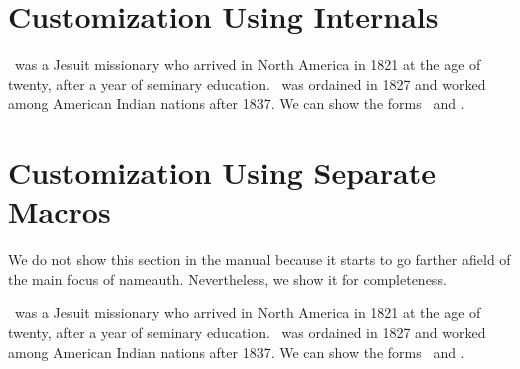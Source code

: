 \documentclass[oneside]{article}
\begin{document}
%
%

\section{Customization Using Internals}

\makeatletter
\newcommand*\Fbox[1]{%
  \if@nameauth@DoAlt\protect\fbox{#1}\else#1\fi
}
\makeatother

\renewcommand*\NamesFormat{}
\renewcommand*\FrontNamesFormat{}
\renewcommand*\MainNameHook{\AltOff}
\renewcommand*\FrontNameHook{\AltOff}

\deSmet\ was a Jesuit missionary who arrived in North
America in 1821 at the age of twenty, after a year of seminary
education. \CapThis\deSmet\ was ordained in 1827 and worked
among American Indian nations after 1837. We can show the forms
\LdeSmet\ and \SdeSmet.

%
%

\section{Customization Using Separate Macros}

We do not show this section in the manual because it starts to go farther afield of the main focus of \textsf{nameauth}. Nevertheless, we show it for completeness.

\newif\ifFbox     %
\newif\ifFirstCap %
\newif\ifInHook   %
\Fboxtrue         %

\renewcommand*\Fbox[1]{%
  \ifFbox\protect\fbox{#1}\else#1\fi
}

\renewcommand*\AltCaps[1]{%
  \ifInHook
    \ifFirstCap\MakeUppercase{#1}\else#1\fi
  \else
    #1%
  \fi
}
\renewcommand*\CapThis{\FirstCaptrue}

\renewcommand*\NamesFormat[1]
  {\InHooktrue\NameParser\global\FirstCapfalse}

\renewcommand*\MainNameHook[1]
  {\Fboxfalse\InHooktrue\NameParser\global\FirstCapfalse}

\let\FrontNamesFormat\Namesformat
\let\FrontNameHook\MainNameHook

\ForgetThis\deSmet\ was a Jesuit missionary who arrived in North
America in 1821 at the age of twenty, after a year of seminary
education. \CapThis\deSmet\ was ordained in 1827 and worked
among American Indian nations after 1837. We can show the forms
\LdeSmet\ and \SdeSmet.
\end{document}
